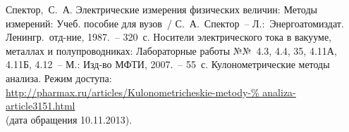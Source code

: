 \documentclass[pscyr,titlepage]{hedreport}
\begin{document}
  \pagebreak
  \renewcommand{\bibname}{Список литературы}

  \begin{thebibliography}{9} 
     Спектор,~С.~А. Электрические измерения физических величин:
      Методы измерений: Учеб. пособие для вузов~/ С.~А.~Спектор~--
      Л.:~Энергоатомиздат. Ленингр.~отд-ние, 1987.~-- 320~с.
     Носители электрического тока в вакууме, металлах и
      полупроводниках: Лабораторные работы №№~4.3, 4.4, 35, 4.11А, 4.11Б,
      4.12~-- М.: Изд-во МФТИ, 2007.~-- 55~с.
     Кулонометрические методы анализа. Режим доступа:\\
      \url{http://pharmax.ru/articles/Kulonometricheskie-metody-%
      analiza-article3151.html}\\
      (дата обращения 10.11.2013).
  \end{thebibliography}
\end{document}

